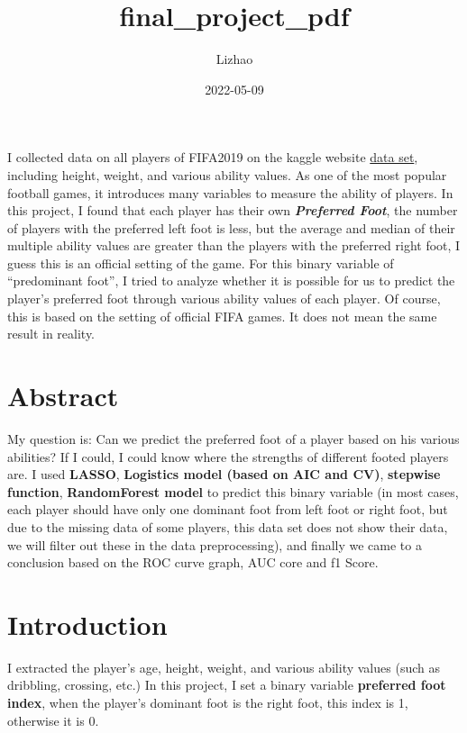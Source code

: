\documentclass[
]{article}
\title{final\_project\_pdf}
\author{Lizhao}
\date{2022-05-09}
\begin{document}
\maketitle

I collected data on all players of FIFA2019 on the kaggle website
\href{https://raw.githubusercontent.com/ChildhoodMoments/data-mining/main/data.csv}{data
set}, including height, weight, and various ability values. As one of
the most popular football games, it introduces many variables to measure
the ability of players. In this project, I found that each player has
their own \textbf{\emph{Preferred Foot}}, the number of players with the
preferred left foot is less, but the average and median of their
multiple ability values are greater than the players with the preferred
right foot, I guess this is an official setting of the game. For this
binary variable of ``predominant foot'', I tried to analyze whether it
is possible for us to predict the player's preferred foot through
various ability values of each player. Of course, this is based on the
setting of official FIFA games. It does not mean the same result in
reality.

\hypertarget{abstract}{%
\section{Abstract}\label{abstract}}

My question is: Can we predict the preferred foot of a player based on
his various abilities? If I could, I could know where the strengths of
different footed players are. I used \textbf{LASSO}, \textbf{Logistics
model (based on AIC and CV)}, \textbf{stepwise function},
\textbf{RandomForest model} to predict this binary variable (in most
cases, each player should have only one dominant foot from left foot or
right foot, but due to the missing data of some players, this data set
does not show their data, we will filter out these in the data
preprocessing), and finally we came to a conclusion based on the ROC
curve graph, AUC core and f1 Score.

\hypertarget{introduction}{%
\section{Introduction}\label{introduction}}

I extracted the player's age, height, weight, and various ability values
(such as dribbling, crossing, etc.) In this project, I set a binary
variable \textbf{preferred foot index}, when the player's dominant foot
is the right foot, this index is 1, otherwise it is 0.
\end{document}
